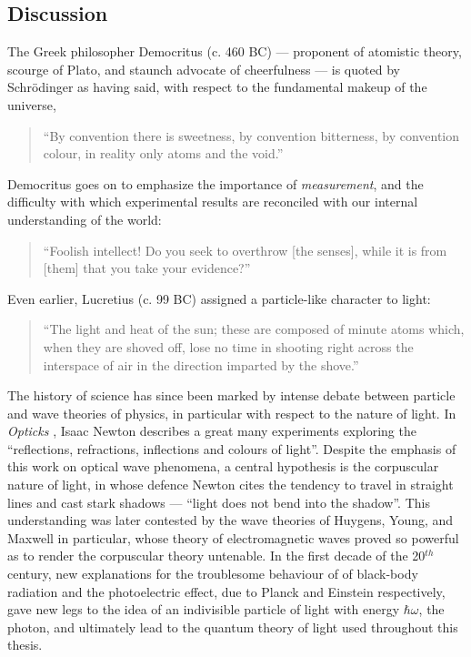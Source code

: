 \subsection{Discussion} 
The Greek philosopher Democritus (c. 460 BC) --- proponent of atomistic theory, scourge of Plato, and staunch advocate of cheerfulness --- is quoted by Schr\"odinger as having said, with respect to the fundamental makeup of the universe,
\begin{quote}
    ``By convention there is sweetness, by convention bitterness, by convention colour, in reality only atoms and the void.'' \cite{Durant1939}
\end{quote}
Democritus goes on to emphasize the importance of \emph{measurement}, and the difficulty with which experimental results are reconciled with our internal understanding of the world:
\begin{quote}
    ``Foolish intellect! Do you seek to overthrow [the senses], while it is from [them] that you take your evidence?''
\end{quote}
Even earlier, Lucretius (c. 99 BC) assigned a particle-like character to light:
\begin{quote}
``The light and heat of the sun; these are composed of minute atoms which, when they are shoved off, lose no time in shooting right across the interspace of air in the direction imparted by the shove.''
\end{quote}
The history of science has since been marked by intense debate between particle and wave theories of physics, in particular with respect to the nature of light.  In \emph{Opticks} \cite{Newton1704}, Isaac Newton describes a great many experiments exploring the ``reflections, refractions, inflections and colours of light''. Despite the emphasis of this work on optical wave phenomena, a central hypothesis is the corpuscular nature of light, in whose defence Newton cites the tendency to travel in straight lines and cast stark shadows --- ``light does not bend into the shadow''.  This understanding was later contested by the wave theories of Huygens, Young, and Maxwell in particular, whose theory of electromagnetic waves proved so powerful as to render the corpuscular theory untenable. 
In the first decade of the 20$^{th}$ century, new explanations for the troublesome behaviour of of black-body radiation and the photoelectric effect, due to Planck and Einstein respectively, gave new legs to the idea of an indivisible particle of light with energy $\hbar \omega$, the photon, and ultimately lead to the quantum theory of light used throughout this thesis. 

